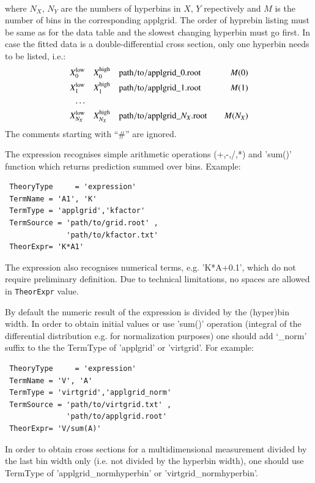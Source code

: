 \begin{description}
\begin{align*}
  \end{align*}
  where \(N_X,\,N_Y\) are the numbers of hyperbins in \(X,\,Y\) repectively and
  \(M\) is the number of bins in the corresponding applgrid. The order of hyprebin
  listing must be same as for the data table and the slowest changing hyperbin 
  must go first. In case the fitted data is a double-differential cross section, only 
  one hyperbin needs to be listed, i.e.:
  \begin{align*}
  X_0^{\mathrm{low}} &\quad X_0^{\mathrm{high}} \quad { \mathrm{path/to/applgrid}}\_0{\mathrm{.root}} &\quad M(0) \\
  X_1^{\mathrm{low}} &\quad X_1^{\mathrm{high}} \quad { \mathrm{path/to/applgrid}}\_1{\mathrm{.root}} &\quad M(1) \\
  \ldots \\
  X_{N_X}^{\mathrm{low}} &\quad X_{N_X}^{\mathrm{high}} \quad { \mathrm{path/to/applgrid}}\_N_X{\mathrm{.root}} &\quad M(N_X) \\
  \end{align*}
  The comments starting with ``\#'' are ignored.
\end{description}
The expression recognises simple arithmetic operations
(+,-,/,*) and 'sum()' function which returns prediction summed over bins.
Example:
\begin{verbatim}
 TheoryType     = 'expression'
 TermName = 'A1', 'K'
 TermType = 'applgrid','kfactor'
 TermSource = 'path/to/grid.root' ,
              'path/to/kfactor.txt'
 TheorExpr= 'K*A1'
\end{verbatim}
The expression also recognises numerical terms, e.g.  'K*A+0.1', which do not
require preliminary definition. Due to technical limitations, no spaces are
allowed in {\tt TheorExpr} value. 

By default the numeric result of the expression is divided by the (hyper)bin
width. In order to obtain initial values or use 'sum()' operation (integral of
the differential distribution e.g. for normalization purposes) one should add
`\_norm' suffix to the the TermType of 'applgrid' or 'virtgrid'. For example: 
\begin{verbatim}
 TheoryType     = 'expression'
 TermName = 'V', 'A'
 TermType = 'virtgrid','applgrid_norm'
 TermSource = 'path/to/virtgrid.txt' ,
              'path/to/applgrid.root'
 TheorExpr= 'V/sum(A)'
\end{verbatim}
In order to obtain cross sections for a multidimensional measurement divided by 
the last bin width only (i.e. not divided by the hyperbin width), one should 
use TermType of 'applgrid\_normhyperbin' or 'virtgrid\_normhyperbin'.


